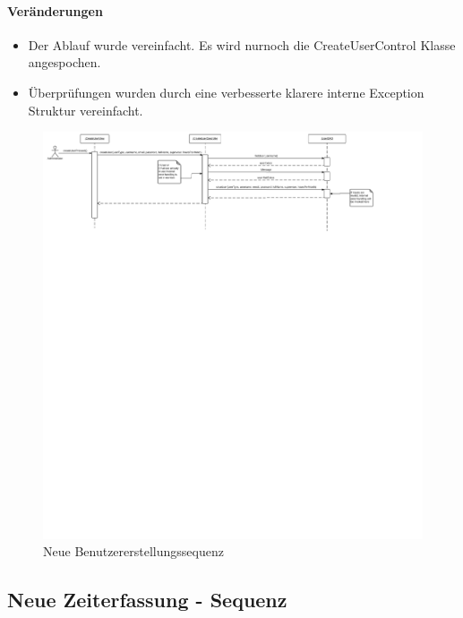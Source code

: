 \paragraph{Veränderungen}
\begin{itemize}
    \item Der Ablauf wurde vereinfacht. Es wird nurnoch die CreateUserControl Klasse angespochen.
    \item Überprüfungen wurden durch eine verbesserte klarere interne Exception Struktur vereinfacht.
\end{itemize}

\begin{figure}
  \centering
    \includegraphics[width=\linewidth]{Create-user-account-new.pdf}
   \caption{Neue Benutzererstellungssequenz}
\end{figure}

\subsection{Neue Zeiterfassung - Sequenz}

